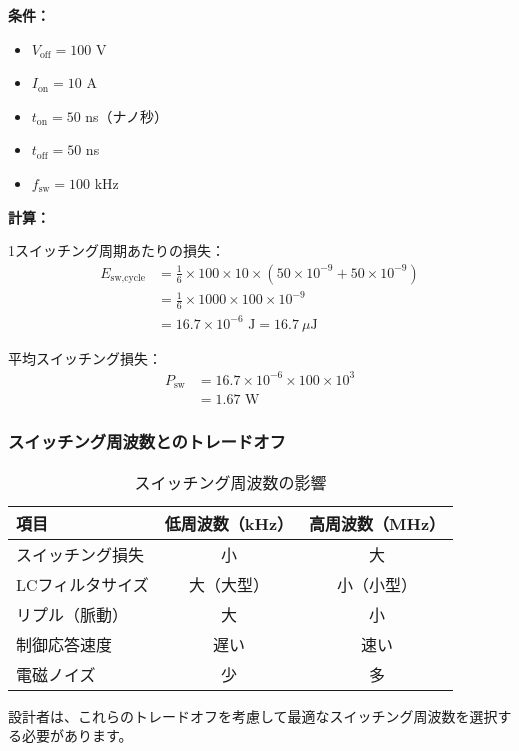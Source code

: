 \begin{screen}
\textbf{条件：}
\begin{itemize}
\item $V_{\text{off}} = 100$ V
\item $I_{\text{on}} = 10$ A
\item $t_{\text{on}} = 50$ ns（ナノ秒）
\item $t_{\text{off}} = 50$ ns
\item $f_{\text{sw}} = 100$ kHz
\end{itemize}

\textbf{計算：}

1スイッチング周期あたりの損失：
\begin{align}
E_{\text{sw,cycle}} &= \frac{1}{6} \times 100 \times 10 \times (50 \times 10^{-9} + 50 \times 10^{-9}) \\
&= \frac{1}{6} \times 1000 \times 100 \times 10^{-9} \\
&= 16.7 \times 10^{-6} \text{ J} = 16.7~\mu\text{J}
\end{align}

平均スイッチング損失：
\begin{align}
P_{\text{sw}} &= 16.7 \times 10^{-6} \times 100 \times 10^3 \\
&= 1.67 \text{ W}
\end{align}
\end{screen}

\subsubsection{スイッチング周波数とのトレードオフ}

\begin{table}[H]
\centering
\caption{スイッチング周波数の影響}
\begin{tabular}{|l|c|c|}
\hline
\textbf{項目} & \textbf{低周波数（kHz）} & \textbf{高周波数（MHz）} \\
\hline
\hline
スイッチング損失 & 小 & 大 \\
\hline
LCフィルタサイズ & 大（大型） & 小（小型） \\
\hline
リプル（脈動） & 大 & 小 \\
\hline
制御応答速度 & 遅い & 速い \\
\hline
電磁ノイズ & 少 & 多 \\
\hline
\end{tabular}
\end{table}

設計者は、これらのトレードオフを考慮して最適なスイッチング周波数を選択する必要があります。

